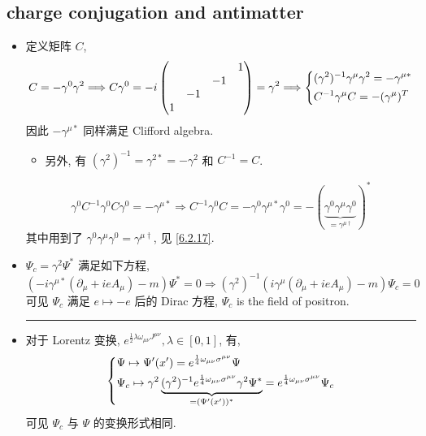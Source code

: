 \subsection{charge conjugation and antimatter}
\begin{itemize}
	\item 定义矩阵 $C$,
	\begin{equation}
		C = - \gamma^0 \gamma^2 \Longrightarrow C \gamma^0 = - i \begin{pmatrix}
			& & & 1 \\
			& & - 1 & \\
			& - 1 & & \\
			1 & & &
		\end{pmatrix} = \gamma^2 \Longrightarrow \begin{dcases}
			(\gamma^2)^{- 1} \gamma^\mu \gamma^2 = - \gamma^{\mu *} \\
			C^{- 1} \gamma^\mu C = - (\gamma^\mu)^T
		\end{dcases}
	\end{equation}
	因此 $- \gamma^{\mu *}$ 同样满足 Clifford algebra.
	\begin{itemize}
		\item 另外, 有 $(\gamma^2)^{- 1} = \gamma^{2 *} = - \gamma^2$ 和 $C^{- 1} = C$.
	\end{itemize}
	
	\begin{tcolorbox}[title=calculation:]
		\begin{equation}
			\gamma^0 C^{- 1} \gamma^0 C \gamma^0 = - \gamma^{\mu *} \Longrightarrow C^{- 1} \gamma^0 C = - \gamma^0 \gamma^{\mu *} \gamma^0 = - (\underbrace{\gamma^0 \gamma^\mu \gamma^0}_{= \gamma^{\mu \dag}})^*
		\end{equation}
		其中用到了 $\gamma^0 \gamma^\mu \gamma^0 = \gamma^{\mu \dag}$, 见 \eqref{6.2.17}.
	\end{tcolorbox}
	
	\item $\Psi_c = \gamma^2 \Psi^*$ 满足如下方程,
	\begin{equation}
		(- i \gamma^{\mu *} (\partial_\mu + i e A_\mu) - m) \Psi^* = 0 \Longrightarrow (\gamma^2)^{- 1} (i \gamma^\mu (\partial_\mu + i e A_\mu) - m) \Psi_c = 0
	\end{equation}
	可见 $\Psi_c$ 满足 $e \mapsto - e$ 后的 Dirac 方程, $\Psi_c$ is the field of positron.
	
	\noindent\rule[0.5ex]{\linewidth}{0.5pt} %
	
	\item 对于 Lorentz 变换, $e^{\frac{1}{2} \lambda \omega_{\mu \nu} J^{\mu \nu}}, \lambda \in [0, 1]$, 有,
	\begin{equation}
		\begin{dcases}
			\Psi \mapsto \Psi'(x') = e^{\frac{1}{4} \omega_{\mu \nu} \sigma^{\mu \nu}} \Psi \\
			\Psi_c \mapsto \gamma^2 \underbrace{(\gamma^2)^{- 1}  e^{\frac{1}{4} \omega_{\mu \nu} \sigma^{\mu \nu}} \gamma^2 \Psi^*}_{= (\Psi'(x'))^*} = e^{\frac{1}{4} \omega_{\mu \nu} \sigma^{\mu \nu}} \Psi_c
		\end{dcases}
	\end{equation}
	可见 $\Psi_c$ 与 $\Psi$ 的变换形式相同.
\end{itemize}
